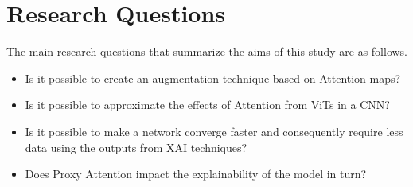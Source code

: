 \section{Research Questions} \label{section:researchq}
The main research questions that summarize the aims of this study are as follows.
\begin{itemize}
    \item Is it possible to create an augmentation technique based on Attention maps?
    \item Is it possible to approximate the effects of Attention from ViTs in a CNN?
    \item Is it possible to make a network converge faster and consequently require less data using the outputs from XAI techniques?
    \item Does Proxy Attention impact the explainability of the model in turn?
\end{itemize}